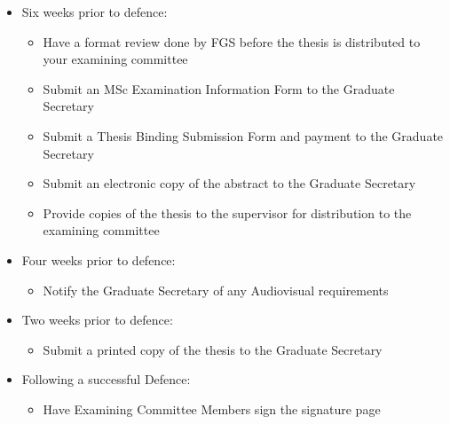 \documentclass[12pt]{article}
\begin{document}
\begin{itemize}
\item Six weeks prior to defence:

        \begin{itemize}

            \item Have a format review done by FGS before the thesis is
                distributed to your examining committee

            \item Submit an MSc Examination Information Form to the Graduate
                Secretary

            \item Submit a Thesis Binding Submission Form and payment to the
                Graduate Secretary

            \item Submit an electronic copy of the abstract to the Graduate
                Secretary

            \item Provide copies of the thesis to the supervisor for
                distribution to the examining committee

        \end{itemize}

    \item Four weeks prior to defence:

        \begin{itemize}

            \item Notify the Graduate Secretary of any Audiovisual requirements

        \end{itemize}

    \item Two weeks prior to defence:
        \begin{itemize}

            \item Submit a printed copy of the thesis to the Graduate Secretary

        \end{itemize}

    \item Following a successful Defence:

        \begin{itemize}

            \item Have Examining Committee Members sign the signature page


\end{itemize}
\end{itemize}
\end{document}

